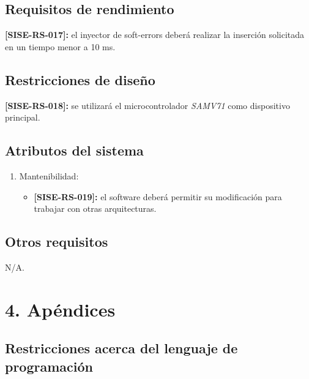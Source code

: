 \documentclass[
11pt, %
codirector, %
]{charter}
\def\codigo{SISE-RS}
\newcommand{\req}[1]{\textbf{[\codigo-#1]:}}
\begin{document}
\subsection{Requisitos de rendimiento}
\label{sub:rendimiento}

\req{017} el inyector de soft-errors deberá realizar la inserción solicitada en un tiempo menor a 10 ms.

\subsection{Restricciones de diseño}
\label{sub:restriccionesDiseño}

\req{018} se utilizará el microcontrolador \emph{SAMV71} como dispositivo principal.

\subsection{Atributos del sistema}
\label{sub:atributos}

\begin{enumerate}
	\item Mantenibilidad:
	\begin{itemize}
		\item \req{019} el software deberá permitir su modificación para trabajar con otras arquitecturas.
	\end{itemize}
\end{enumerate}

\subsection{Otros requisitos}
\label{sub:otros}

N/A.

\section{4. Apéndices}
\label{sec:apendices}



\subsection{Restricciones acerca del lenguaje de programación}
\end{document}
